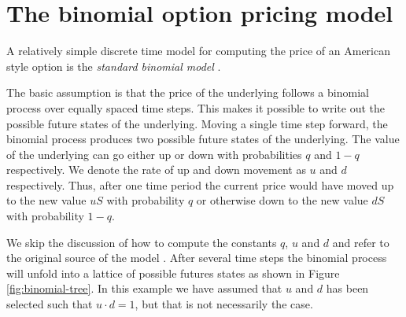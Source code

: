 \section{The binomial option pricing model}
A relatively simple discrete time model for computing the price of an
American style option is the \emph{standard binomial model}
\cite{cox1979option}. 

The basic assumption is that the price of the underlying follows a
binomial process over equally spaced time steps. This makes it
possible to write out the possible future states of the
underlying. Moving a single time step forward, the binomial process
produces two possible future states of the underlying. The value of
the underlying can go either up or down with probabilities $q$ and $1
- q$ respectively. We denote the rate of up and down movement as $u$
and $d$ respectively. Thus, after one time period the current price
would have moved up to the new value $uS$ with probability $q$ or
otherwise down to the new value $dS$ with probability $1-q$.

We skip the discussion of how to compute the constants $q$, $u$ and
$d$ and refer to the original source of the model
\cite{cox1979option}. After several time steps the binomial process
will unfold into a lattice of possible futures states as shown in
Figure \ref{fig:binomial-tree}. In this example we have assumed that
$u$ and $d$ has been selected such that $u\cdot d = 1$, but that is
not necessarily the case.

